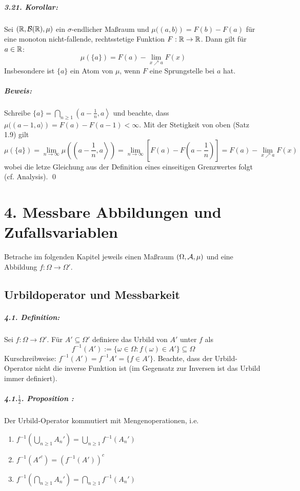 \documentclass[12pt]{report}
\begin{document}
\paragraph{3.21. Korollar:}Sei $(\mathbb{R},\mathcal{B}(\mathbb{R}),\mu)$ ein $\sigma$-endlicher Ma\ss{}raum und $\mu((a,b\rangle)=F(b)-F(a)$ f\"ur eine monoton nicht-fallende, rechtsstetige Funktion $F:\mathbb{R}\to\mathbb{R}$. Dann gilt f\"ur $a\in\mathbb{R}$:
$$\mu(\{a\})=F(a)-\lim_{x\nearrow a}F(x)$$
Insbesondere ist $\{a\}$ ein Atom von $\mu$, wenn $F$ eine Sprungstelle bei $a$ hat.

\paragraph{Beweis:}Schreibe $\{a\}=\bigcap_{n\geq1}\left(a-\frac{1}{n},a\right\rangle$ und beachte, dass $\mu((a-1,a\rangle)=F(a)-F(a-1)<\infty$. Mit der Stetigkeit von oben (Satz 1.9) gilt
$$\mu(\{a\})=\lim_{n\to\infty}\mu\left(\left(a-\frac{1}{n},a\right\rangle\right)=\lim_{n\to\infty}\left[F(a)-F\left(a-\frac{1}{n}\right)\right]=F(a)-\lim_{x\nearrow a}F(x)$$
wobei die letze Gleichung aus der Definition eines einseitigen Grenzwertes folgt (cf. Analysis). \qed

\chapter*{4. Messbare Abbildungen und Zufallsvariablen}

Betrache im folgenden Kapitel jeweils einen Ma\ss{}raum $(\Omega,\mathcal{A},\mu)$ und eine Abbildung $f:\Omega\to\Omega'$.

 \section*{Urbildoperator und Messbarkeit}
\paragraph{4.1. Definition:}Sei $f:\Omega\to\Omega'$. F\"ur $A'\subseteq\Omega'$ definiere das Urbild von $A'$ unter $f$ als
$$f^{-1}(A'):=\{\omega\in\Omega:f(\omega)\in A'\}\subseteq\Omega$$
Kurschreibweise: $f^{-1}(A')=f^{-1}A'=\{f\in A'\}$. Beachte, dass der Urbild-Operator nicht die inverse Funktion ist (im Gegensatz zur Inversen ist das Urbild immer definiert).

\paragraph{4.1.$\frac{1}{2}$. Proposition :}Der Urbild-Operator kommutiert mit Mengenoperationen, i.e.
\begin{enumerate}[label=(\roman*)]
    \item $\displaystyle f^{-1}\left(\bigcup_{n\geq1}A_n'\right)=\bigcup_{n\geq1}f^{-1}(A_n')$
    \item $\displaystyle f^{-1}(A'^c)=\left(f^{-1}(A')\right)^c$
    \item $\displaystyle f^{-1}\left(\bigcap_{n\geq1}A_n'\right)=\bigcap_{n\geq1}f^{-1}(A_n')$
\end{enumerate}
\end{document}
